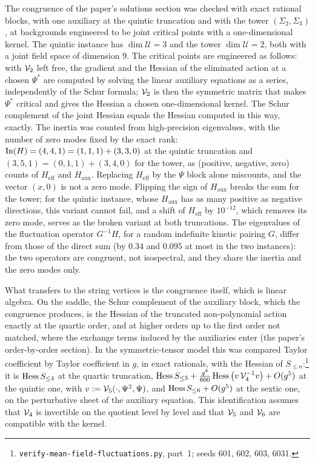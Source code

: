 The congruence of the paper's solutions section was checked with exact rational blocks, with one auxiliary at the quintic truncation and with the tower $(\Sigma_2, \Sigma_3)$, at backgrounds engineered to be joint critical points with a one-dimensional kernel.
The quintic instance has $\dim \mathcal U = 3$ and the tower $\dim \mathcal U = 2$, both with a joint field space of dimension $9$.
The critical points are engineered as follows: with $\mathcal{V}_{2}$ left free, the gradient and the Hessian of the eliminated action at a chosen $\Psi^*$ are computed by solving the linear auxiliary equations as a series, independently of the Schur formula; $\mathcal{V}_{2}$ is then the symmetric matrix that makes $\Psi^*$ critical and gives the Hessian a chosen one-dimensional kernel.
The Schur complement of the joint Hessian equals the Hessian computed in this way, exactly.
The inertia was counted from high-precision eigenvalues, with the number of zero modes fixed by the exact rank: $\operatorname{In}(H) = (4, 4, 1) = (1, 1, 1) + (3, 3, 0)$ at the quintic truncation and $(3, 5, 1) = (0, 1, 1) + (3, 4, 0)$ for the tower, as (positive, negative, zero) counts of $H_{\mathrm{eff}}$ and $H_{\mathrm{aux}}$.
Replacing $H_{\mathrm{eff}}$ by the $\Psi$ block alone miscounts, and the vector $(x, 0)$ is not a zero mode.
Flipping the sign of $H_{\mathrm{aux}}$ breaks the sum for the tower; for the quintic instance, whose $H_{\mathrm{aux}}$ has as many positive as negative directions, this variant cannot fail, and a shift of $H_{\mathrm{eff}}$ by $10^{-12}$, which removes its zero mode, serves as the broken variant at both truncations.
The eigenvalues of the fluctuation operator $G^{-1} H$, for a random indefinite kinetic pairing $G$, differ from those of the direct sum (by $0.34$ and $0.095$ at most in the two instances): the two operators are congruent, not isospectral, and they share the inertia and the zero modes only.

What transfers to the string vertices is the congruence itself, which is linear algebra.
On the saddle, the Schur complement of the auxiliary block, which the congruence produces, is the Hessian of the truncated non-polynomial action exactly at the quartic order, and at higher orders up to the first order not matched, where the exchange terms induced by the auxiliaries enter (the paper's order-by-order section).
In the symmetric-tensor model this was compared Taylor coefficient by Taylor coefficient in $g$, in exact rationals, with the Hessian of $S_{\le n}$:\footnote{\texttt{verify-mean-field-fluctuations.py}, part~1; seeds 601, 602, 603, 6031.} it is $\operatorname{Hess} S_{\le 4}$ at the quartic truncation, $\operatorname{Hess} S_{\le 5} + \tfrac{g^4}{600} \operatorname{Hess} \big( v \, \mathcal{V}_{4}^{-1} v \big) + O(g^5)$ at the quintic one, with $v := \mathcal{V}_{5}(\cdot, \Psi^2, \Psi)$, and $\operatorname{Hess} S_{\le 6} + O(g^5)$ at the sextic one, on the perturbative sheet of the auxiliary equation.
This identification assumes that $\mathcal{V}_{4}$ is invertible on the quotient level by level and that $\mathcal{V}_{5}$ and $\mathcal{V}_{6}$ are compatible with the kernel.

